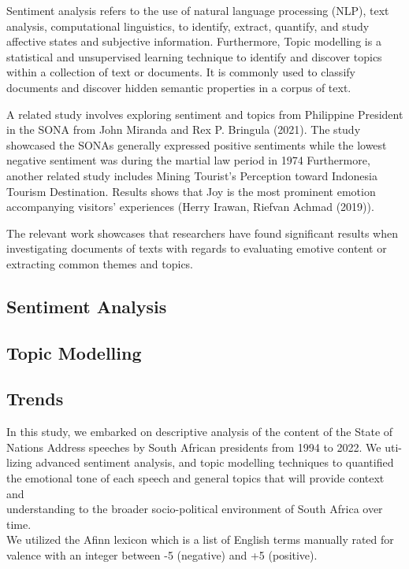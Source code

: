 \documentclass[
  letterpaper,
  DIV=11,
  numbers=noendperiod]{scrartcl}
\begin{document}
Sentiment analysis refers to the use of natural language processing
(NLP), text analysis, computational linguistics, to identify, extract,
quantify, and study affective states and subjective information.
Furthermore, Topic modelling is a statistical and unsupervised learning
technique to identify and discover topics within a collection of text or
documents. It is commonly used to classify documents and discover hidden
semantic properties in a corpus of text.

A related study involves exploring sentiment and topics from Philippine
President in the SONA from John Miranda and Rex P. Bringula (2021). The
study showcased the SONAs generally expressed positive sentiments while
the lowest negative sentiment was during the martial law period in 1974
Furthermore, another related study includes Mining Tourist's Perception
toward Indonesia Tourism Destination. Results shows that Joy is the most
prominent emotion accompanying visitors' experiences (Herry Irawan,
Riefvan Achmad (2019)).

The relevant work showcases that researchers have found significant
results when investigating documents of texts with regards to evaluating
emotive content or extracting common themes and topics.

\hypertarget{sentiment-analysis}{%
\subsection{Sentiment Analysis}\label{sentiment-analysis}}

\hypertarget{topic-modelling}{%
\subsection{Topic Modelling}\label{topic-modelling}}

\hypertarget{trends}{%
\subsection{Trends}\label{trends}}

In this study, we embarked on descriptive analysis of the content of the
State of\\
Nations Address speeches by South African presidents from 1994 to 2022.
We uti-\\
lizing advanced sentiment analysis, and topic modelling techniques to
quantified\\
the emotional tone of each speech and general topics that will provide
context and\\
understanding to the broader socio-political environment of South Africa
over time.\\
We utilized the Afinn lexicon which is a list of English terms manually
rated for\\
valence with an integer between -5 (negative) and +5 (positive).
\end{document}
